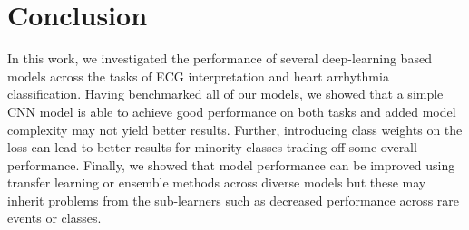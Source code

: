\section{Conclusion}
\label{sec:conclusion}

In this work, we investigated the performance of several deep-learning based models across the tasks of ECG interpretation and heart arrhythmia classification. Having benchmarked all of our models, we showed that a simple CNN model is able to achieve good performance on both tasks and added model complexity may not yield better results. Further, introducing class weights on the loss can lead to better results for minority classes trading off some overall performance. Finally, we showed that model performance can be improved using transfer learning or ensemble methods across diverse models but these may inherit problems from the sub-learners such as decreased performance across rare events or classes. 


